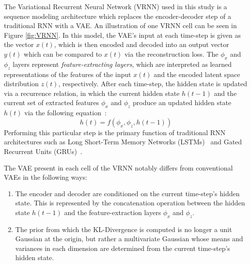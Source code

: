 \documentclass[12pt, a4paper]{article}
\begin{document}
The Variational Recurrent Neural Network (VRNN) used in this study is a sequence modeling architecture
which replaces the encoder-decoder step of a traditional RNN with a VAE. 
An illustration of one VRNN cell can be seen
in Figure \ref{fig:VRNN}. 
In this model, the VAE's input at each time-step is given as the vector $x(t)$, which is then encoded and decoded into an output vector $y(t)$ which can be compared to $x(t)$ via the reconstruction loss.
The $\phi_{x}$ and $\phi_{z}$ layers represent \textit{feature-extracting layers}, which are interpreted as learned representations of the features of the input $x(t)$ and the encoded latent space distribution $z(t)$, respectively. 
After each time-step, the hidden state is updated via a recurrence relation, in which the current hidden state $h(t-1)$ and the current set of extracted features $\phi_{x}$ and $\phi_{z}$ produce an updated hidden state $h(t)$ via the following equation~\cite{chung2016recurrent}:
\begin{equation}
	h(t) = f(\phi_{x}, \phi_{z}, h(t-1))
\end{equation} 
Performing this particular step is the primary function of traditional RNN architectures such as Long Short-Term Memory Networks (LSTMs)~\cite{lstm} and Gated Recurrent Units (GRUs)~\cite{cho2014learning}. %

The VAE present in each cell of the VRNN notably differs from
conventional VAEs in the following ways:
\begin{enumerate}
  \item{The encoder and decoder are conditioned on the current time-step's hidden state.
  This is represented by the concatenation operation between the hidden state $h(t-1)$ and the feature-extraction layers $\phi_{x}$ and $\phi_{z}$.}
  \item{The prior from which the KL-Divergence is computed is no longer a unit Gaussian
  at the origin, but rather a multivariate Gaussian whose means and variances in each 
  dimension are determined from the current time-step's hidden state.}
\end{enumerate}
\end{document}
